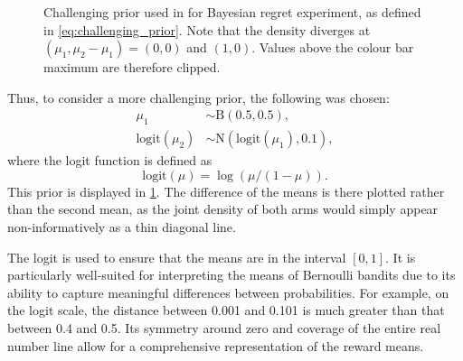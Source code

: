 \begin{figure}[t]
    \centering
    \caption[
        Challenging prior used in Bayesian regret experiment.
    ]
    {
        Challenging prior used in for Bayesian regret experiment, as defined in \cref{eq:challenging_prior}.
        Note that the density diverges at $(\mu_1, \mu_2 - \mu_1) = (0, 0)$ and $(1, 0)$.
        Values above the colour bar maximum are therefore clipped.
    }
    \label{fig:prior1}
\end{figure}

Thus, to consider a more challenging prior, the following was chosen:
\begin{equation}
    \label{eq:challenging_prior}
    \begin{aligned}
        \mu_1               & \sim \text{B}(0.5, 0.5),                 \\
        \text{logit}(\mu_2) & \sim \text{N}(\text{logit}(\mu_1), 0.1),
    \end{aligned}
\end{equation}
where the logit function is defined as
\begin{equation}
    \label{eq:logit}
    \text{logit}(\mu) = \log(\mu/(1-\mu)).
\end{equation}
This prior is displayed in \cref{fig:prior1}.
The difference of the means is there plotted rather than the second mean, as the joint density of both arms would simply appear non-informatively as a thin diagonal line.

The logit is used to ensure that the means are in the interval $[0, 1]$.
It is particularly well-suited for interpreting the means of Bernoulli bandits due to its ability to capture meaningful differences between probabilities. For example, on the logit scale, the distance between 0.001 and 0.101 is much greater than that between 0.4 and 0.5.
Its symmetry around zero and coverage of the entire real number line allow for a comprehensive representation of the reward means.



